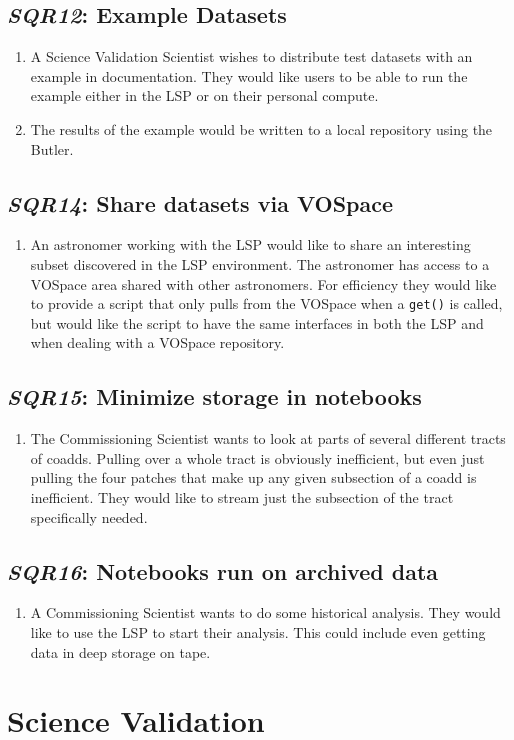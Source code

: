 \documentclass[DM,toc,lsstdraft]{lsstdoc}
\newcommand{\usecase}[3]{%
\subsection{\emph{#1}: #2}
\label{use:#1}
\begin{enumerate}[label=\alph*.]
#3
\end{enumerate}
}
\begin{document}
\usecase{SQR12}{Example Datasets}{%

\item
A Science Validation Scientist wishes to distribute test datasets with an example in documentation.
They would like users to be able to run the example either in the LSP or on their personal compute.

\item
The results of the example would be written to a local repository using the Butler.

}

\usecase{SQR14}{Share datasets via VOSpace}{%

\item
An astronomer working with the LSP would like to share an interesting subset discovered in the LSP environment.
The astronomer has access to a VOSpace area shared with other astronomers.
For efficiency they would like to provide a script that only pulls from the VOSpace when a \texttt{get()} is called, but would like the script to have the same interfaces in both the LSP and when dealing with a VOSpace repository.

}

\usecase{SQR15}{Minimize storage in notebooks}{%

\item
The Commissioning Scientist wants to look at parts of several different tracts of coadds.
Pulling over a whole tract is obviously inefficient, but even just pulling the four patches that make up any given subsection of a coadd is inefficient.
They would like to stream just the subsection of the tract specifically needed.

}

\usecase{SQR16}{Notebooks run on archived data}{%

\item
A Commissioning Scientist wants to do some historical analysis.
They would like to use the LSP to start their analysis.
This could include even getting data in deep storage on tape.

}

\section{Science Validation}
\end{document}
